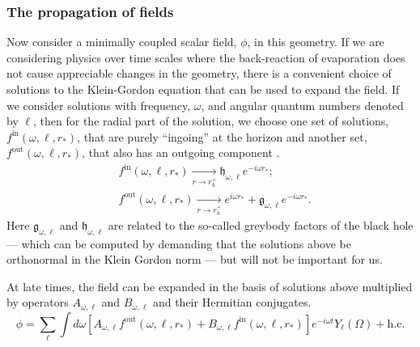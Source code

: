 \documentclass[12pt]{article}
\def\fout{f^{\text{out}}}
\def\fin{f^{\text{in}}}
\def\grey{\mathfrak{g}}
\def\white{\mathfrak{h}}
\def\rtor{{r_*}}
\newcommand{\be}{\begin{equation}}
\newcommand{\ee}{\end{equation}}
\begin{document}
\subsubsection*{The propagation of fields }
Now consider a minimally coupled scalar field, $\phi$,  in this geometry.  If we are considering physics over time scales where the back-reaction of evaporation does not cause appreciable changes in the geometry,  there is a convenient choice of solutions to the Klein-Gordon equation that can be used to expand the field. If we consider solutions with frequency, $\omega$, and angular quantum numbers denoted by $\ell$, then for the radial part of the solution, we choose one set of solutions, $\fin(\omega, \ell, \rtor)$, that are purely ``ingoing'' at the horizon and another set, $\fout(\omega, \ell, \rtor)$, that also has an outgoing component \cite{Candelas:1980zt,dewitt1975quantum}.
\be
\label{foutfinexpansion}
\begin{split}
&\fin(\omega, \ell, \rtor) \underset{r \rightarrow r_h^+}{\longrightarrow} \white_{\omega, \ell} e^{-i \omega \rtor};\\
&\fout(\omega, \ell, \rtor)  \underset{r \rightarrow r_h^+}{\longrightarrow} e^{i \omega \rtor} + \grey_{\omega, \ell} e^{-i \omega \rtor}.
\end{split}
\ee
Here $\grey_{\omega, \ell}$ and $\white_{\omega, \ell}$ are related to the so-called greybody factors of the black hole --- which can be computed by demanding that the solutions above be orthonormal in the Klein Gordon norm --- but will not be important for us.

At late times, the field can be expanded in the basis of solutions above  multiplied by operators $A_{\omega, \ell}$ and $B_{\omega, \ell}$ and their Hermitian conjugates.
\be
\label{fieldoutside}
\phi = \sum_{\ell} \int d \omega \left[A_{\omega, \ell} \fout(\omega, \ell, \rtor)  + B_{\omega, \ell} \fin(\omega, \ell, \rtor)\right] e^{-i \omega t} Y_{\ell}(\Omega) + \text{h.c.}
\ee
\end{document}
